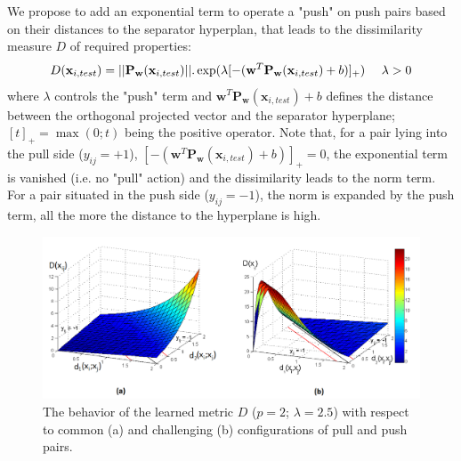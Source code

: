 We propose to add an exponential term to operate a "push" on push pairs based on their distances to the separator hyperplan, that leads to the dissimilarity measure $D$ of required properties:
\begin{equation}
D(\textbf{x}_{i,test}) = 
||\textbf{P}_\textbf{w}(\textbf{x}_{i,test})||.
\exp(\lambda[-(\textbf{w}^T\textbf{P}_\textbf{w}(\textbf{x}_{i,test}) + b)]_+)
\text{ \quad  } \lambda > 0
\label{eq:dissimilarity_learn}
\end{equation}
where $\lambda$ controls the "push" term and $\textbf{w}^T\textbf{P}_\textbf{w}(\textbf{x}_{i,test}) + b$ defines the distance between the orthogonal projected vector and the separator hyperplane; $[t]_+ = \max(0; t)$ being the positive operator. Note that, for a pair lying into the pull side ($y_{ij} = +1$), $[-(\textbf{w}^T\textbf{P}_\textbf{w}(\textbf{x}_{i,test}) + b)]_+ = 0$, the exponential term is vanished (i.e. no "pull" action) and the dissimilarity leads to the norm term. For a pair situated in the push side ($y_{ij} = -1$), the norm is expanded by the push term, all the more the distance to the hyperplane is high.

\begin{figure}[h!]
	\centering
	\includegraphics[width=0.95\linewidth]{images/3D_diss}
	\caption{The behavior of the learned metric $D$ ($p = 2$; $\lambda = 2.5$) with respect to common (a) and challenging (b) configurations of pull and push pairs.}
	\label{fig:3D_diss}
\end{figure}


